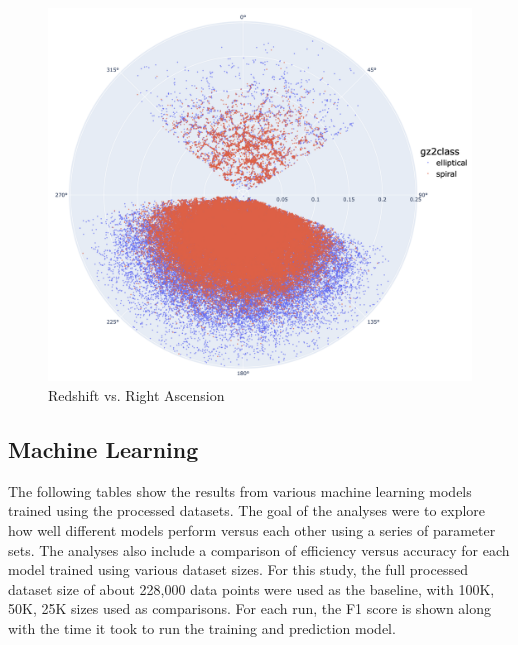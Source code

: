 \documentclass[11pt,sigconf]{acmart}
\begin{document}
\begin{figure}[htbp]
  \centering
  \includegraphics[scale=0.2]{redshift_polar}
  \caption{Redshift vs. Right Ascension}
  \label{fig:redshift_polar}
\end{figure}


\subsection{Machine Learning}
 
The following tables show the results from various machine learning models 
trained using the processed datasets. The goal of the analyses were to explore 
how well different models perform versus each other using a series of parameter sets. 
The analyses also include a comparison of efficiency versus accuracy for each model 
trained using various dataset sizes. For this study, the full processed dataset size of 
about 228,000 data points were used as the baseline, with 100K, 50K, 25K sizes used 
as comparisons. For each run, the F1 score is shown along with the time it took 
to run the training and prediction model. \\
\end{document}
